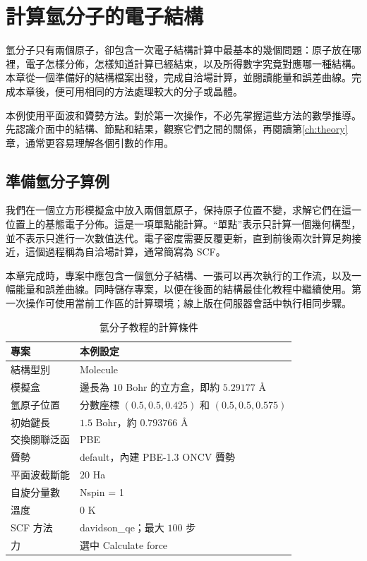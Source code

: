 \chapter{計算氫分子的電子結構}\label{ch:first}

氫分子只有兩個原子，卻包含一次電子結構計算中最基本的幾個問題：原子放在哪裡，電子怎樣分佈，怎樣知道計算已經結束，以及所得數字究竟對應哪一種結構。本章從一個準備好的結構檔案出發，完成自洽場計算，並閱讀能量和誤差曲線。完成本章後，便可用相同的方法處理較大的分子或晶體。

本例使用平面波和贗勢方法。對於第一次操作，不必先掌握這些方法的數學推導。先認識介面中的結構、節點和結果，觀察它們之間的關係，再閱讀第\ref{ch:theory}章，通常更容易理解各個引數的作用。

\section{準備氫分子算例}

我們在一個立方形模擬盒中放入兩個氫原子，保持原子位置不變，求解它們在這一位置上的基態電子分佈。這是一項單點能計算。“單點”表示只計算一個幾何構型，並不表示只進行一次數值迭代。電子密度需要反覆更新，直到前後兩次計算足夠接近，這個過程稱為自洽場計算，通常簡寫為 SCF。

本章完成時，專案中應包含一個氫分子結構、一張可以再次執行的工作流，以及一幅能量和誤差曲線。同時儲存專案，以便在後面的結構最佳化教程中繼續使用。第一次操作可使用當前工作區的計算環境；線上版在伺服器會話中執行相同步驟。

\begin{table}[htbp]
\centering
\caption{氫分子教程的計算條件}
\begin{tabularx}{\linewidth}{lX}
\toprule
專案 & 本例設定\\
\midrule
結構型別 & Molecule\\
模擬盒 & 邊長為 $10$ Bohr 的立方盒，即約 $5.29177$ Å\\
氫原子位置 & 分數座標 $(0.5,0.5,0.425)$ 和 $(0.5,0.5,0.575)$\\
初始鍵長 & $1.5$ Bohr，約 $0.793766$ Å\\
交換關聯泛函 & PBE\\
贗勢 & default，內建 PBE-1.3 ONCV 贗勢\\
平面波截斷能 & $20$ Ha\\
自旋分量數 & Nspin = 1\\
溫度 & $0$ K\\
SCF 方法 & davidson\_qe；最大 $100$ 步\\
力 & 選中 Calculate force\\
\bottomrule
\end{tabularx}
\end{table}

